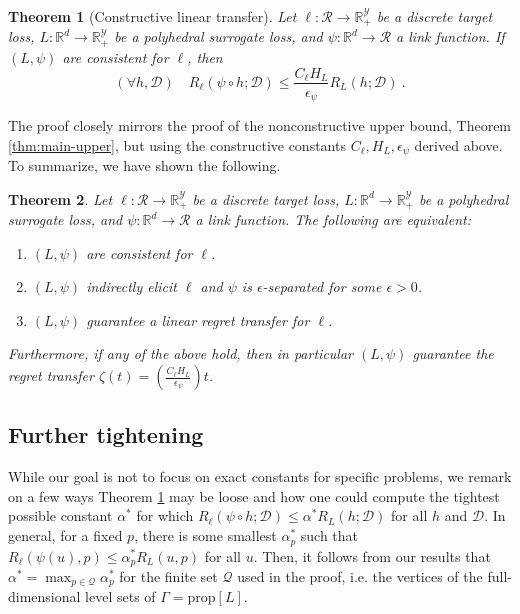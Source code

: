 \documentclass{article}
\newtheorem{theorem}{Theorem}
\theoremstyle{definition}\newtheorem{definition}{Definition}
\theoremstyle{definition}\newtheorem{assumption}{Assumption}
\newcommand{\reals}{\mathbb{R}}
\newcommand{\prop}[1]{\mathrm{prop}[#1]}
\newcommand{\D}{\mathcal{D}}
\newcommand{\R}{\mathcal{R}}
\newcommand{\Y}{\mathcal{Y}}
\begin{document}
\begin{theorem}[Constructive linear transfer] \label{thm:separated-constant}
  Let $\ell: \R \to \reals_+^{\Y}$ be a discrete target loss, $L: \reals^d \to \reals_+^{\Y}$ be a polyhedral surrogate loss, and $\psi: \reals^d \to \R$ a link function.
  If $(L,\psi)$ are consistent for $\ell$, then
    \[ (\forall h,\D) \quad R_{\ell}(\psi \circ h ; \D) \leq \frac{C_{\ell} H_L}{\epsilon_{\psi}} R_L(h ; \D) ~. \]
\end{theorem}
The proof closely mirrors the proof of the nonconstructive upper bound, Theorem \ref{thm:main-upper}, but using the constructive constants $C_{\ell}, H_L, \epsilon_{\psi}$ derived above.
To summarize, we have shown the following.
\begin{theorem} \label{thm:tfae}
  Let $\ell: \R \to \reals_+^{\Y}$ be a discrete target loss, $L: \reals^d \to \reals_+^{\Y}$ be a polyhedral surrogate loss, and $\psi: \reals^d \to \R$ a link function.
  The following are equivalent:
  \begin{enumerate}
    \item $(L,\psi)$ are consistent for $\ell$.
    \item $(L,\psi)$ indirectly elicit $\ell$ and $\psi$ is $\epsilon$-separated for some $\epsilon > 0$.
    \item $(L,\psi)$ guarantee a linear regret transfer for $\ell$.
  \end{enumerate}
  Furthermore, if any of the above hold, then in particular $(L,\psi)$ guarantee the regret transfer $\zeta(t) = \left(\frac{C_{\ell} H_L}{\epsilon_{\psi}}\right) t$.
\end{theorem}

\subsection{Further tightening}
While our goal is not to focus on exact constants for specific problems, we remark on a few ways Theorem \ref{thm:separated-constant} may be loose and how one could compute the tightest possible constant $\alpha^*$ for which $R_{\ell}(\psi \circ h;\D) \leq \alpha^* R_L(h;\D)$ for all $h$ and $\D$.
In general, for a fixed $p$, there is some smallest $\alpha_p^*$ such that $R_{\ell}(\psi(u),p) \leq \alpha_p^* R_L(u,p)$ for all $u$.
Then, it follows from our results that $\alpha^* = \max_{p \in \mathcal{Q}} \alpha_p^*$ for the finite set $\mathcal{Q}$ used in the proof, i.e. the vertices of the full-dimensional level sets of $\Gamma = \prop{L}$.
\end{document}
